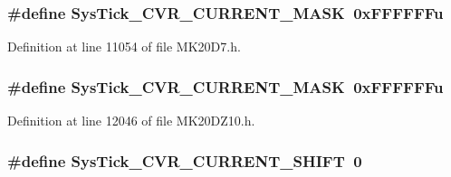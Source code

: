 \subsubsection[{\texorpdfstring{Sys\+Tick\+\_\+\+C\+V\+R\+\_\+\+C\+U\+R\+R\+E\+N\+T\+\_\+\+M\+A\+SK}{SysTick_CVR_CURRENT_MASK}}]{\setlength{\rightskip}{0pt plus 5cm}\#define Sys\+Tick\+\_\+\+C\+V\+R\+\_\+\+C\+U\+R\+R\+E\+N\+T\+\_\+\+M\+A\+SK~0x\+F\+F\+F\+F\+F\+Fu}\hypertarget{group___sys_tick___register___masks_ga24c6d345c97c669b426339ffda71aa8b}{}\label{group___sys_tick___register___masks_ga24c6d345c97c669b426339ffda71aa8b}


Definition at line 11054 of file M\+K20\+D7.\+h.

\subsubsection[{\texorpdfstring{Sys\+Tick\+\_\+\+C\+V\+R\+\_\+\+C\+U\+R\+R\+E\+N\+T\+\_\+\+M\+A\+SK}{SysTick_CVR_CURRENT_MASK}}]{\setlength{\rightskip}{0pt plus 5cm}\#define Sys\+Tick\+\_\+\+C\+V\+R\+\_\+\+C\+U\+R\+R\+E\+N\+T\+\_\+\+M\+A\+SK~0x\+F\+F\+F\+F\+F\+Fu}\hypertarget{group___sys_tick___register___masks_ga24c6d345c97c669b426339ffda71aa8b}{}\label{group___sys_tick___register___masks_ga24c6d345c97c669b426339ffda71aa8b}


Definition at line 12046 of file M\+K20\+D\+Z10.\+h.

\subsubsection[{\texorpdfstring{Sys\+Tick\+\_\+\+C\+V\+R\+\_\+\+C\+U\+R\+R\+E\+N\+T\+\_\+\+S\+H\+I\+FT}{SysTick_CVR_CURRENT_SHIFT}}]{\setlength{\rightskip}{0pt plus 5cm}\#define Sys\+Tick\+\_\+\+C\+V\+R\+\_\+\+C\+U\+R\+R\+E\+N\+T\+\_\+\+S\+H\+I\+FT~0}\hypertarget{group___sys_tick___register___masks_ga1e9eb575c58a4638dabd21775fa22c19}{}\label{group___sys_tick___register___masks_ga1e9eb575c58a4638dabd21775fa22c19}


